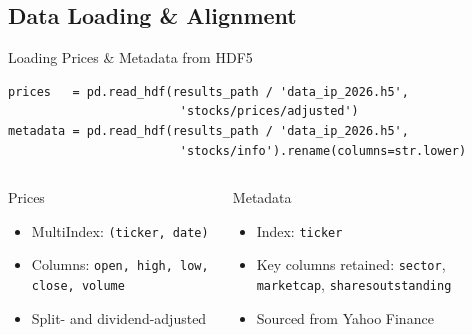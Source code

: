 \documentclass[aspectratio=169]{beamer}
\begin{document}
\subsection{Data Loading \& Alignment}
%
\begin{frame}[fragile]{Loading Prices \& Metadata from HDF5}

\begin{lstlisting}
prices   = pd.read_hdf(results_path / 'data_ip_2026.h5',
                        'stocks/prices/adjusted')
metadata = pd.read_hdf(results_path / 'data_ip_2026.h5',
                        'stocks/info').rename(columns=str.lower)
\end{lstlisting}

\vspace{0.3cm}

\begin{columns}[T]
\begin{block}{Prices}
\begin{itemize}
  \item MultiIndex: \texttt{(ticker, date)}
  \item Columns: \texttt{open, high, low, close, volume}
  \item Split- and dividend-adjusted
\end{itemize}
\end{block}

\begin{block}{Metadata}
\begin{itemize}
  \item Index: \texttt{ticker}
  \item Key columns retained: \texttt{sector}, \texttt{marketcap}, \texttt{sharesoutstanding}
  \item Sourced from Yahoo Finance
\end{itemize}
\end{block}
\end{columns}

\end{frame}
%
%
\end{document}
